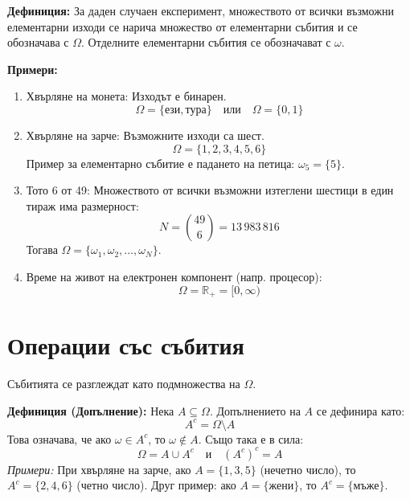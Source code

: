 \documentclass{article}
\begin{document}
\textbf{Дефиниция:} За даден случаен експеримент, множеството от всички възможни елементарни изходи се нарича множество от елементарни събития и се обозначава с $\Omega$. Отделните елементарни събития се обозначават с $\omega$.

\textbf{Примери:}
\begin{enumerate}
    \item Хвърляне на монета: Изходът е бинарен.
    \[ \Omega = \{ \text{ези}, \text{тура} \} \quad \text{или} \quad \Omega = \{ 0, 1 \} \]
    \item Хвърляне на зарче: Възможните изходи са шест.
    \[ \Omega = \{ 1, 2, 3, 4, 5, 6 \} \]
    Пример за елементарно събитие е падането на петица: $\omega_5 = \{ 5 \}$.
    \item Тото 6 от 49: Множеството от всички възможни изтеглени шестици в един тираж има размерност:
    \[ N = \binom{49}{6} = 13\,983\,816 \]
    Тогава $\Omega = \{ \omega_1, \omega_2, \dots, \omega_N \}$.
    \item Време на живот на електронен компонент (напр. процесор):
    \[ \Omega = \mathbb{R}_+ = [0, \infty) \]
\end{enumerate}

\section{Операции със събития}
Събитията се разглеждат като подмножества на $\Omega$.

\textbf{Дефиниция (Допълнение):} Нека $A \subseteq \Omega$. Допълнението на $A$ се дефинира като:
\[ A^c = \Omega \setminus A \]
Това означава, че ако $\omega \in A^c$, то $\omega \notin A$. Също така е в сила:
\[ \Omega = A \cup A^c \quad \text{и} \quad (A^c)^c = A \]
\emph{Примери:} При хвърляне на зарче, ако $A = \{ 1, 3, 5 \}$ (нечетно число), то $A^c = \{ 2, 4, 6 \}$ (четно число). Друг пример: ако $A = \{ \text{жени} \}$, то $A^c = \{ \text{мъже} \}$.
\end{document}
